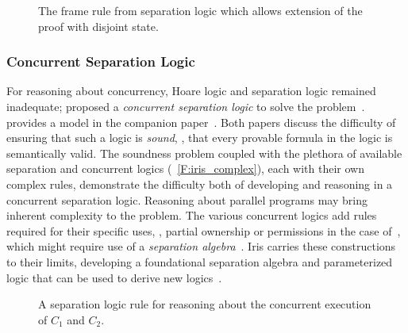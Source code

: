 \begin{figure}[ht]
    \centering
    \caption{The frame rule from separation logic which allows extension of the
    proof with disjoint state.}\label{F:frame}
\end{figure}

\subsubsection{Concurrent Separation Logic}

For reasoning about concurrency, Hoare logic and separation logic remained
inadequate; \citeauthor{O_Hearn_2007} proposed a \emph{concurrent separation
logic} to solve the problem~\cite{O_Hearn_2007}. \citeauthor{Brookes_2007}
provides a model in the companion paper~\cite{Brookes_2007}. Both papers discuss
the difficulty of ensuring that such a logic is \emph{sound}, \ie, that every
provable formula in the logic is semantically valid. The soundness problem
coupled with the plethora of available separation and concurrent logics
(\figurename~\ref{F:iris_complex}), each with their own complex rules,
demonstrate the difficulty both of developing and reasoning in a concurrent
separation logic. Reasoning about parallel programs may bring inherent
complexity to the problem. The various concurrent logics add rules required for
their specific uses, \eg, partial ownership or permissions in the case
of~\cite{Appel_2011}, which might require use of a \emph{separation
algebra}~\cite{Jung_2016,Krebbers_2017a}. Iris carries these constructions to
their limits, developing a foundational separation algebra and parameterized
logic that can be used to derive new logics~\cite{Jung_2018b}.

\begin{figure}[ht]
    \centering
    \caption{A separation logic rule for reasoning about the concurrent
    execution of \(C_1\) and \(C_2\).}\label{F:CSL_ex}
\end{figure}

